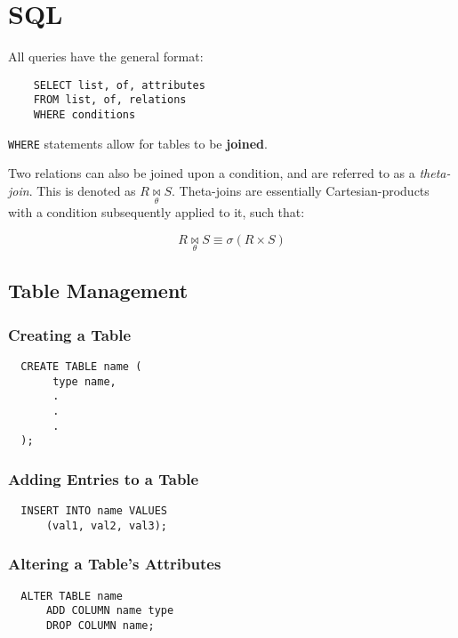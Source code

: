 \documentclass{article}
\begin{document}
\section{SQL}

All queries have the general format:

\begin{lstlisting}
    SELECT list, of, attributes
    FROM list, of, relations
    WHERE conditions
\end{lstlisting}

\texttt{WHERE} statements allow for tables to be \textbf{joined}.

Two relations can also be joined upon a condition, and are referred to as a \textit{theta-join}. This is denoted as $R \underset{\theta}{\Join} S$. Theta-joins are essentially Cartesian-products with a condition subsequently applied to it, such that:

\[ R \underset{\theta}{\Join} S \equiv \sigma(R \times S) \]

\subsection{Table Management}

\subsubsection{Creating a Table}

\begin{lstlisting}
  CREATE TABLE name (
       type name,
       .
       .
       .
  );
\end{lstlisting}

\subsubsection{Adding Entries to a Table}

\begin{lstlisting}
  INSERT INTO name VALUES
      (val1, val2, val3);
\end{lstlisting}

\subsubsection{Altering a Table's Attributes}

\begin{lstlisting}
  ALTER TABLE name
      ADD COLUMN name type
      DROP COLUMN name;
\end{lstlisting}
\end{document}
